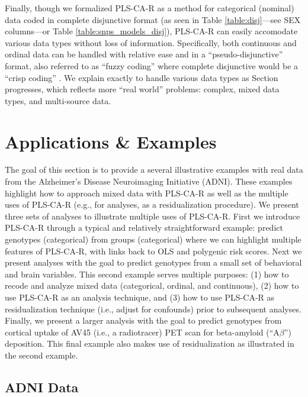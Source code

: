 \documentclass[12pt]{article}
\begin{document}
Finally, though we formalized PLS-CA-R as a method for categorical
(nominal) data coded in complete disjunctive format (as seen in Table
\ref{table:disj}---see SEX columns---or Table
\ref{table:snps_models_disj}), PLS-CA-R can easily accomodate various
data types without loss of information. Specifically, both continuous
and ordinal data can be handled with relative ease and in a
``pseudo-disjunctive'' format, also referred to as ``fuzzy coding''
where complete disjunctive would be a ``crisp coding''
\citep{greenacrefuzzy}. We explain exactly to handle various data types
as Section \label{section:appex} progresses, which reflects more ``real
world'' problems: complex, mixed data types, and multi-source data.

\hypertarget{applications-examples}{%
\section{Applications \& Examples}\label{applications-examples}}

\label{section:appex}

The goal of this section is to provide a several illustrative examples
with real data from the Alzheimer's Disease Neuroimaging Initiative
(ADNI). These examples highlight how to approach mixed data with
PLS-CA-R as well as the multiple uses of PLS-CA-R (e.g., for analyses,
as a residualization procedure). We present three sets of analyses to
illustrate multiple uses of PLS-CA-R. First we introduce PLS-CA-R
through a typical and relatively straightforward example: predict
genotypes (categorical) from groups (categorical) where we can highlight
multiple features of PLS-CA-R, with links back to OLS and polygenic risk
scores. Next we present analyses with the goal to predict genotypes from
a small set of behavioral and brain variables. This second example
serves multiple purposes: (1) how to recode and analyze mixed data
(categorical, ordinal, and continuous), (2) how to use PLS-CA-R as an
analysis technique, and (3) how to use PLS-CA-R as residualization
technique (i.e., adjust for confounds) prior to subsequent analyses.
Finally, we present a larger analysis with the goal to predict genotypes
from cortical uptake of AV45 (i.e., a radiotracer) PET scan for
beta-amyloid (``A\(\beta\)'') deposition. This final example also makes
use of residualization as illustrated in the second example.

\hypertarget{adni-data}{%
\subsection{ADNI Data}\label{adni-data}}
\end{document}
